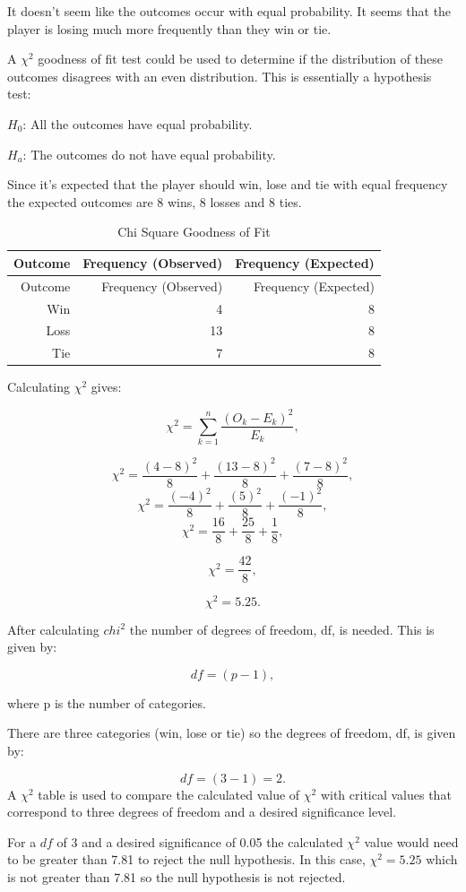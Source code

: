 \documentclass[
]{book}
\begin{document}
It doesn't seem like the outcomes occur with equal probability. It seems that the player is losing much more frequently than they win or tie.

A \(\chi^2\) goodness of fit test could be used to determine if the distribution of these outcomes disagrees with an even distribution. This is essentially a hypothesis test:

\(H_0\): All the outcomes have equal probability.

\(H_a\): The outcomes do not have equal probability.

Since it's expected that the player should win, lose and tie with equal frequency the expected outcomes are 8 wins, 8 losses and 8 ties.

\begin{longtable}[]{@{}rrr@{}}
\caption{\label{tab:table0011} Chi Square Goodness of Fit}\tabularnewline
\toprule
Outcome & Frequency (Observed) & Frequency (Expected) \\
\midrule
\endfirsthead
\toprule
Outcome & Frequency (Observed) & Frequency (Expected) \\
\midrule
\endhead
Win & 4 & 8 \\
Loss & 13 & 8 \\
Tie & 7 & 8 \\
\bottomrule
\end{longtable}

Calculating \(\chi^2\) gives:

\[\chi^2=\sum_{k=1}^{n}\frac{(O_k-E_k)^2}{E_k},\]

\[\chi^2=\frac{(4-8)^2}{8}+\frac{(13-8)^2}{8}+\frac{(7-8)^2}{8},\]
\[\chi^2=\frac{(-4)^2}{8}+\frac{(5)^2}{8}+\frac{(-1)^2}{8},\]
\[\chi^2=\frac{16}{8}+\frac{25}{8}+\frac{1}{8},\]

\[\chi^2=\frac{42}{8},\]

\[\chi^2=5.25.\]

After calculating \(chi^2\) the number of degrees of freedom, df, is needed. This is given by:

\[df=(p-1),\]

where p is the number of categories.

There are three categories (win, lose or tie) so the degrees of freedom, df, is given by:

\[df=(3-1)=2.\]
A \(\chi^2\) table is used to compare the calculated value of \(\chi^2\) with critical values that correspond to three degrees of freedom and a desired significance level.

For a \(df\) of 3 and a desired significance of 0.05 the calculated \(\chi^2\) value would need to be greater than 7.81 to reject the null hypothesis. In this case, \(\chi^2=5.25\) which is not greater than 7.81 so the null hypothesis is not rejected.
\end{document}
